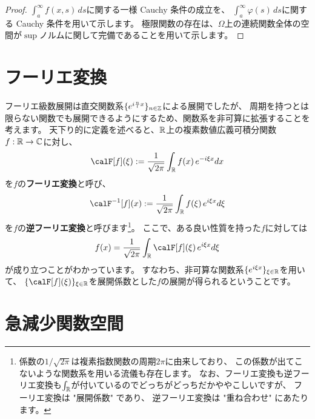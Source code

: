 \documentclass[report]{jlreq}
\begin{document}
\begin{proof}
    $\int_a^\infty f(x, s)\, ds$に関する一様 Cauchy 条件の成立を、
    $\int_a^\infty \varphi(s)\, ds$に関する Cauchy 条件を用いて示します。
    極限関数の存在は、$\Omega$上の連続関数全体の空間が$\sup$ノルムに関して完備であることを用いて示します。
\end{proof}





%
\section{フーリエ変換}

フーリエ級数展開は直交関数系$\{ e^{i\frac{n}{l} x} \}_{n \in \mathbb{Z}}$による展開でしたが、
周期を持つとは限らない関数でも展開できるようにするため、関数系を非可算に拡張することを考えます。
天下り的に定義を述べると、$\mathbb{R}$上の複素数値広義可積分関数$f: \mathbb{R} \to \mathbb{C}$に対し、
\begin{equation}
    \calF [f] (\xi) := \frac{1}{\sqrt{2\pi}} \int_\R f(x)\, e^{-i\xi x} dx
    \label{eq:4:1:1}
\end{equation}
を$f$の\textbf{フーリエ変換}と呼び、
\begin{equation}
    \calF^{-1} [f] (x) := \frac{1}{\sqrt{2\pi}} \int_\R f(\xi)\, e^{i\xi x} d\xi
    \label{eq:4:1:2}
\end{equation}
を$f$の\textbf{逆フーリエ変換}と呼びます\footnote{
    係数の$1/\sqrt{2\pi}$は複素指数関数の周期$2\pi$に由来しており、
    この係数が出てこないような関数系を用いる流儀も存在します。
    なお、フーリエ変換も逆フーリエ変換も$\int_{\mathbb{R}}$が付いているのでどっちがどっちだかややこしいですが、
    フーリエ変換は "展開係数" であり、
    逆フーリエ変換は "重ね合わせ" にあたります。
}。
ここで、ある良い性質を持った$f$に対しては
\begin{equation}
    f(x) = \frac{1}{\sqrt{2\pi}} \int_\R \calF [f](\xi)\, e^{i\xi x} d\xi
\end{equation}
が成り立つことがわかっています。
すなわち、非可算な関数系$\{ e^{i\xi x} \}_{\xi \in \mathbb{R}}$を用いて、
$\{\calF [f](\xi)\}_{\xi \in \R}$を展開係数とした$f$の展開が得られるということです。

%
\section{急減少関数空間}
\end{document}
